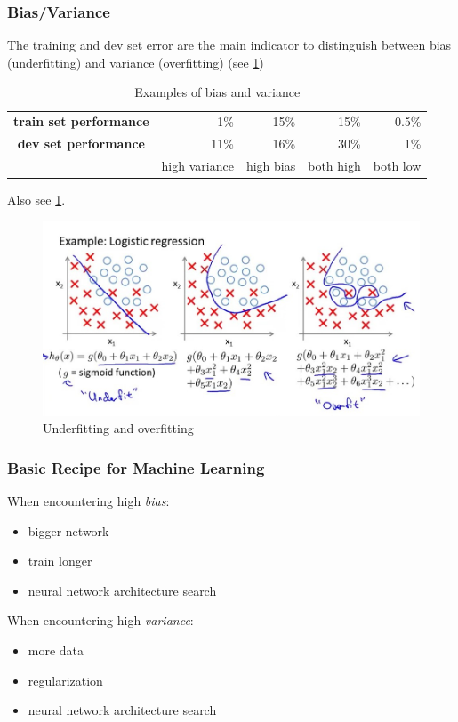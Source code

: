 \documentclass{article}
\begin{document}
\subsubsection{Bias/Variance}
The training and dev set error are the main indicator to distinguish between
bias (underfitting) and variance (overfitting) (see \cref{tbl:biasvariance})
\begin{table}[htbp]
  \begin{center}
    \begin{tabular}{crrrr}\toprule
      \textbf{train set performance} &  1\% & 15\% & 15\% & 0.5\%\\
      \textbf{dev set performance}   & 11\% & 16\% & 30\% & 1\%\\\midrule
      & high variance & high bias & both high & both low\\\bottomrule
    \end{tabular}
    \caption{Examples of bias and variance\label{tbl:biasvariance}}
  \end{center}
\end{table}
Also see \cref{fig:regularisation}.
\begin{figure}[htbp]
  \begin{center}
    \includegraphics[width=\textwidth]{regularisation}
    \caption{Underfitting and overfitting}
    \label{fig:regularisation}
  \end{center}
\end{figure}

\subsubsection{Basic Recipe for Machine Learning}
When encountering high \emph{bias}:
\begin{itemize}
  \item bigger network
  \item train longer
  \item neural network architecture search
\end{itemize}
When encountering high \emph{variance}:
\begin{itemize}
  \item more data
  \item regularization
  \item neural network architecture search
\end{itemize}
\end{document}
